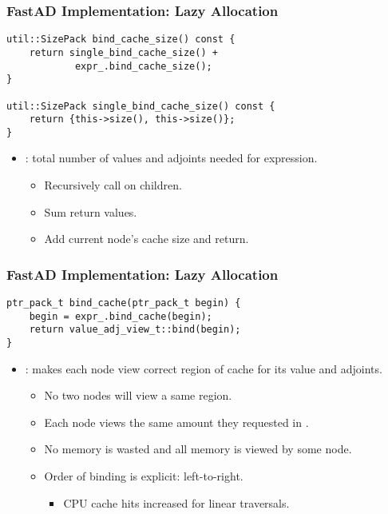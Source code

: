 \begin{frame}[fragile]
\frametitle{FastAD Implementation: Lazy Allocation}
\begin{lstlisting}[style=customcpp]
util::SizePack bind_cache_size() const { 
    return single_bind_cache_size() + 
            expr_.bind_cache_size();
}

util::SizePack single_bind_cache_size() const {
    return {this->size(), this->size()};
}
\end{lstlisting}
\begin{itemize}
    
\item {}: total number of values and adjoints needed for expression.
    \begin{itemize}
        \item Recursively call on children.
        \item Sum return values.
        \item Add current node's cache size and return.
    \end{itemize}

\end{itemize}
\end{frame}

\begin{frame}[fragile]
\frametitle{FastAD Implementation: Lazy Allocation}
\begin{lstlisting}[style=customcpp]
ptr_pack_t bind_cache(ptr_pack_t begin) { 
    begin = expr_.bind_cache(begin);
    return value_adj_view_t::bind(begin);
}
\end{lstlisting}
\begin{itemize}

\item {}: makes each node view correct region of cache for its value and adjoints.
    \begin{itemize}
        \item No two nodes will view a same region.
        \item Each node views the same amount they requested in .
        \item No memory is wasted and all memory is viewed by some node.
        \item Order of binding is explicit: left-to-right.
            \begin{itemize}
                \item CPU cache hits increased for linear traversals.
            \end{itemize}
    \end{itemize}

\end{itemize}
\end{frame}


